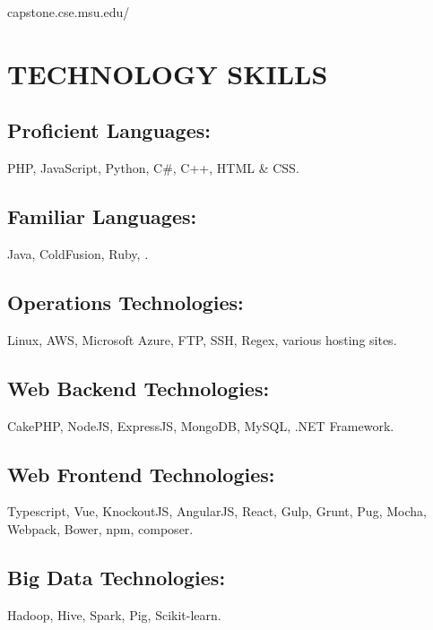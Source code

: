 \documentclass{material-resume}
\begin{document}
\begin{minipage}[t]{0.35\textwidth}
\begin{tcolorbox}[
            boxrule=0pt,
            top=0pt,
            colback=white,
            enhanced,
            drop shadow,
    	]
    	capstone.cse.msu.edu/ \href{http://www.capstone.cse.msu.edu/2017-08/projects/humana/}{} \\
    	\sectionsep
    			
    	
    	\section{TECHNOLOGY SKILLS}
    	\subsection{\small Proficient Languages:} 
    	PHP, JavaScript, Python, C\#, C++, HTML \& CSS.\newline
    	\subsection{\small Familiar Languages:} 
    	Java, ColdFusion, Ruby, .\newline
    	\subsection{\small Operations Technologies:} Linux, AWS, Microsoft Azure, FTP, SSH, Regex, various hosting sites. \newline
    	\subsection{\small Web Backend Technologies:} CakePHP, NodeJS, ExpressJS, MongoDB, MySQL, .NET Framework. \newline
    	\subsection{\small Web Frontend Technologies:} Typescript, Vue, KnockoutJS, AngularJS, React, Gulp, Grunt, Pug, Mocha, Webpack, Bower, npm, composer. \newline
    	\subsection{\small Big Data Technologies:} Hadoop, Hive, Spark, Pig, Scikit-learn. \newline
    	

\end{tcolorbox}
\end{minipage}
\end{document}

